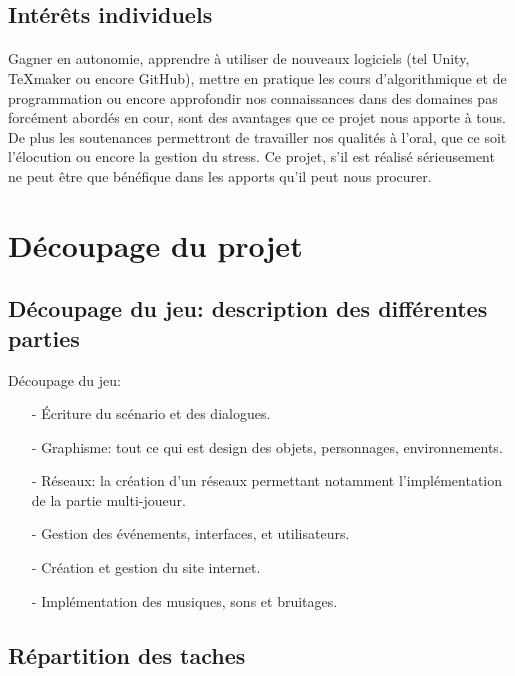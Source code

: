 \documentclass[12pt,a4paper]{article}
\begin{document}
\subsection{Intérêts individuels}
\paragraph{}
Gagner en autonomie, apprendre à utiliser de nouveaux logiciels (tel Unity, TeXmaker ou encore GitHub), mettre en pratique les cours d'algorithmique et de programmation ou encore approfondir nos connaissances dans des domaines pas forcément abordés en cour, sont des avantages que ce projet nous apporte à tous.
De plus les soutenances permettront de travailler nos qualités à l'oral, que ce soit l'élocution ou encore la gestion du stress. Ce projet, s'il est réalisé sérieusement ne peut être que bénéfique dans les apports qu'il peut nous procurer.

\newpage
\section{Découpage du projet}
\subsection{Découpage du jeu: description des différentes \newline parties}
Découpage du jeu:
\begin{itemize}
\item[-] Écriture du scénario et des dialogues.
\item[-] Graphisme: tout ce qui est design des objets, personnages, environnements.
\item[-] Réseaux: la création d'un réseaux permettant notamment l'implémentation de la partie multi-joueur.
\item[-] Gestion des événements, interfaces, et utilisateurs.
\item[-] Création et gestion du site internet.
\item[-] Implémentation des musiques, sons et bruitages.
\end{itemize}
\newpage
\subsection{Répartition des taches}
\end{document}
